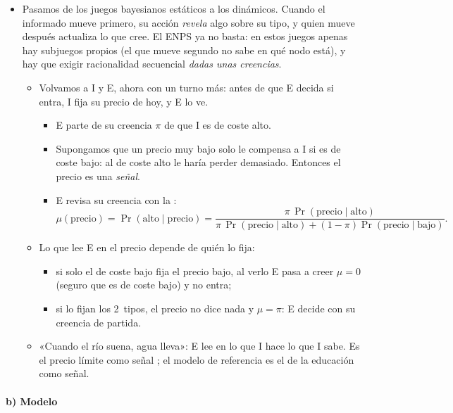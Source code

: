 \documentclass[11pt]{article}
\begin{document}
\begin{itemize}
\item Pasamos de los juegos bayesianos estáticos a los dinámicos. Cuando el informado mueve primero, su acción \emph{revela} algo sobre su tipo, y quien mueve después actualiza lo que cree. El ENPS ya no basta: en estos juegos apenas hay subjuegos propios (el que mueve segundo no sabe en qué nodo está), y hay que exigir racionalidad secuencial \emph{dadas unas creencias}.
  \begin{itemize}
  \item Volvamos a \textup{I} y E, ahora con un turno más: antes de que E decida si entra, \textup{I} fija su precio de hoy, y E lo ve.
    \begin{itemize}
    \item E parte de su creencia $\pi$ de que \textup{I} es de coste alto.
    \item Supongamos que un precio muy bajo solo le compensa a \textup{I} si es de coste bajo: al de coste alto le haría perder demasiado. Entonces el precio es una \emph{señal}.
    \item E revisa su creencia con la :
\[
\mu(\text{precio})=\Pr(\text{alto}\mid\text{precio})=\frac{\pi\,\Pr(\text{precio}\mid\text{alto})}{\pi\,\Pr(\text{precio}\mid\text{alto})+(1-\pi)\Pr(\text{precio}\mid\text{bajo})}.
\]
    \end{itemize}
  \item Lo que lee E en el precio depende de quién lo fija:
    \begin{itemize}
    \item si solo el de coste bajo fija el precio bajo, al verlo E pasa a creer $\mu=0$ (seguro que es de coste bajo) y no entra;
    \item si lo fijan los 2~tipos, el precio no dice nada y $\mu=\pi$: E decide con su creencia de partida.
    \end{itemize}
  \item «Cuando el río suena, agua lleva»: E lee en lo que \textup{I} hace lo que \textup{I} sabe. Es el precio límite como señal\nocite{MilgromRoberts1982Limit} ; el modelo de referencia es el de la educación como señal.
  \end{itemize}
\end{itemize}

\paragraph{b) Modelo}
\end{document}
